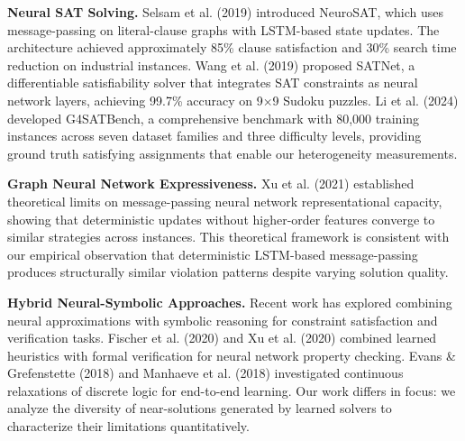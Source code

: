 
\textbf{Neural SAT Solving.} Selsam et al. (2019) introduced NeuroSAT, which uses message-passing on literal-clause graphs with LSTM-based state updates. The architecture achieved approximately 85\% clause satisfaction and 30\% search time reduction on industrial instances. Wang et al. (2019) proposed SATNet, a differentiable satisfiability solver that integrates SAT constraints as neural network layers, achieving 99.7\% accuracy on 9×9 Sudoku puzzles. Li et al. (2024) developed G4SATBench, a comprehensive benchmark with 80,000 training instances across seven dataset families and three difficulty levels, providing ground truth satisfying assignments that enable our heterogeneity measurements.

\textbf{Graph Neural Network Expressiveness.} Xu et al. (2021) established theoretical limits on message-passing neural network representational capacity, showing that deterministic updates without higher-order features converge to similar strategies across instances. This theoretical framework is consistent with our empirical observation that deterministic LSTM-based message-passing produces structurally similar violation patterns despite varying solution quality.

\textbf{Hybrid Neural-Symbolic Approaches.} Recent work has explored combining neural approximations with symbolic reasoning for constraint satisfaction and verification tasks. Fischer et al. (2020) and Xu et al. (2020) combined learned heuristics with formal verification for neural network property checking. Evans \& Grefenstette (2018) and Manhaeve et al. (2018) investigated continuous relaxations of discrete logic for end-to-end learning. Our work differs in focus: we analyze the diversity of near-solutions generated by learned solvers to characterize their limitations quantitatively.
